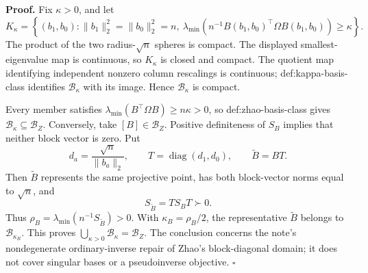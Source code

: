 \textbf{Proof.}
Fix \(\kappa>0\), and let
\[
K_\kappa=\left\{(b_1,b_0):\lVert b_1\rVert_2^2=\lVert b_0\rVert_2^2=n,\ 
\lambda_{\min}\!\left(n^{-1}B(b_1,b_0)^{\top}\Omega B(b_1,b_0)\right)\ge\kappa\right\}.
\]
The product of the two radius-\(\sqrt n\) spheres is compact. The displayed smallest-eigenvalue map is continuous, so \(K_\kappa\) is closed and compact. The quotient map identifying independent nonzero column rescalings is continuous; def:kappa-basis-class identifies \(\mathcal B_\kappa\) with its image. Hence \(\mathcal B_\kappa\) is compact.

Every member satisfies \(\lambda_{\min}(B^{\top}\Omega B)\ge n\kappa>0\), so def:zhao-basis-class gives \(\mathcal B_\kappa\subseteq\mathcal B_Z\). Conversely, take \([B]\in\mathcal B_Z\). Positive definiteness of \(S_B\) implies that neither block vector is zero. Put
\[
d_a=\frac{\sqrt n}{\lVert b_a\rVert_2},
\qquad T=\operatorname{diag}(d_1,d_0),
\qquad \widetilde B=BT.
\]
Then \(\widetilde B\) represents the same projective point, has both block-vector norms equal to \(\sqrt n\), and
\[
S_{\widetilde B}=T S_BT\succ0.
\]
Thus \(\rho_B=\lambda_{\min}(n^{-1}S_{\widetilde B})>0\). With \(\kappa_B=\rho_B/2\), the representative \(\widetilde B\) belongs to \(\mathcal B_{\kappa_B}\). This proves \(\bigcup_{\kappa>0}\mathcal B_\kappa=\mathcal B_Z\). The conclusion concerns the note's nondegenerate ordinary-inverse repair of Zhao's block-diagonal domain; it does not cover singular bases or a pseudoinverse objective. \(\square\)